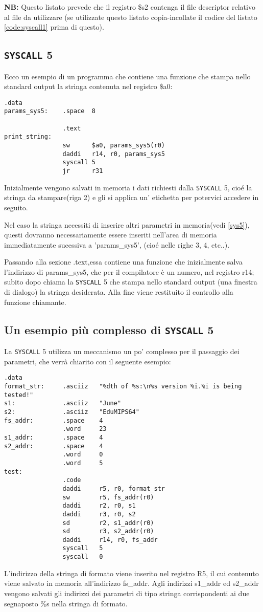 \documentclass[12pt]{report}
\newcommand{\SC}{\texttt{SYSCALL}}
\newcommand{\OF}{\textbf{NB:} Questo listato prevede che il registro \$s2 contenga il file descriptor
relativo al file da utilizzare (se utilizzate questo listato copia-incollate il codice del listato \ref{code:syscall1} prima di questo).}
\begin{document}
\OF{}
\subsection{\SC{} 5}
Ecco un esempio di un programma che contiene una funzione che stampa nello
standard output la stringa contenuta nel registro \$a0:
\begin{lstlisting}[caption={Esempio \SC{} 5}, label={code:syscall5}, style={mips}]
                .data
params_sys5:    .space  8

                .text
print_string:   
                sw      $a0, params_sys5(r0)    
                daddi   r14, r0, params_sys5
                syscall 5
                jr      r31
\end{lstlisting}
Inizialmente vengono salvati in memoria i dati richiesti dalla \SC{} 5, cio\'e
la stringa da stampare(riga 2) e gli si applica un' etichetta per potervici
accedere in seguito.

Nel caso la stringa necessiti di inserire altri parametri in memoria(vedi
\ref{sys5}), questi dovranno necessariamente essere inseriti nell'area di
memoria immediatamente sucessiva a 'params\_sys5', (cio\'e nelle righe 3, 4,
etc..).  

Passando alla sezione .text,essa contiene una funzione che inizialmente salva
l'indirizzo di params\_sys5, che per il compilatore \`{e} un numero, nel
registro r14; subito dopo chiama la \SC{} 5 che stampa nello
standard output (una finestra di dialogo) la stringa desiderata. Alla fine viene
restituito il controllo alla funzione chiamante.

\subsection{Un esempio pi\`u complesso di \SC{} 5}
La \SC{} 5 utilizza un meccanismo un po' complesso per il passaggio dei
parametri, che verr\`a chiarito con il seguente esempio:

\begin{lstlisting}[caption={Esempio non banale di \SC{} 5}, label={code:printf}, style={mips}]
                .data
format_str:     .asciiz   "%dth of %s:\n%s version %i.%i is being tested!"
s1:             .asciiz   "June"
s2:             .asciiz   "EduMIPS64"
fs_addr:        .space    4
                .word     23    
s1_addr:        .space    4
s2_addr:        .space    4
                .word     0
                .word     5
test:
                .code
                daddi     r5, r0, format_str
                sw        r5, fs_addr(r0)
                daddi     r2, r0, s1
                daddi     r3, r0, s2
                sd        r2, s1_addr(r0)
                sd        r3, s2_addr(r0)
                daddi     r14, r0, fs_addr
                syscall   5
                syscall   0
\end{lstlisting}
L'indirizzo della stringa di formato viene inserito nel registro R5, il cui
contenuto viene salvato in memoria all'indirizzo fs\_addr. Agli indirizzi
s1\_addr ed s2\_addr vengono salvati gli indirizzi dei parametri di tipo stringa
corrispondenti ai due segnaposto \%s nella stringa di formato.
\end{document}
